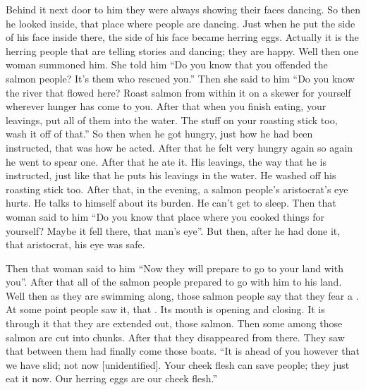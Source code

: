 \begin{pairs}
\begin{Rightside}
\pstart
{}Behind it next door to him they were always showing their faces dancing.
So then he looked inside, that place where people are dancing.
\!Just when he put the side of his face inside there, the side of his face became herring eggs.
Actually it is the herring people that are telling stories and dancing;
they are happy.
Well then one woman summoned him.
She told him
\qqk{}“Do you know that you offended the salmon people?
It’s them who rescued you.”
Then she said to him
\qqk{}“Do you know the river that flowed here?
Roast salmon from within it on a skewer for yourself wherever hunger has come to you.
After that when you finish eating, your leavings, put all of them into the water.
The stuff on your roasting stick too, wash it off of that.”
So then when he got hungry,
just how he had been instructed,
that was how he acted.
After that he felt very hungry again so again he went to spear one.
After that he ate it.
His leavings, the way that he is instructed, just like that he puts his leavings in the water.
He washed off his roasting stick too.
After that, in the evening, a salmon people’s aristocrat’s eye hurts.
He talks to himself about its burden.
He can’t get to sleep.
Then that woman said to him
\qqk{}“Do you know that place where you cooked things for yourself?
Maybe it fell there, that man’s eye”.
But then, after he had done it, that aristocrat, his eye was safe.
\pend

\pstart
{}Then that woman said to him
\qqk{}“Now they will prepare to go to your land with you”.
After that all of the salmon people prepared to go with him to his land.
Well then as they are swimming along, those salmon people say that they fear a .
At some point people saw it, that .
Its mouth is opening and closing.
It is through it that they are extended out, those salmon.
Then some among those salmon are cut into chunks.
After that they disappeared from there.
They saw that between them had finally come those boats.
\qqk{}“It is ahead of you however that we have slid; not now [unidentified].
Your cheek flesh can save people; they just eat it now.
Our herring eggs are our cheek flesh.”
\pend


\end{Rightside}
\end{pairs}

